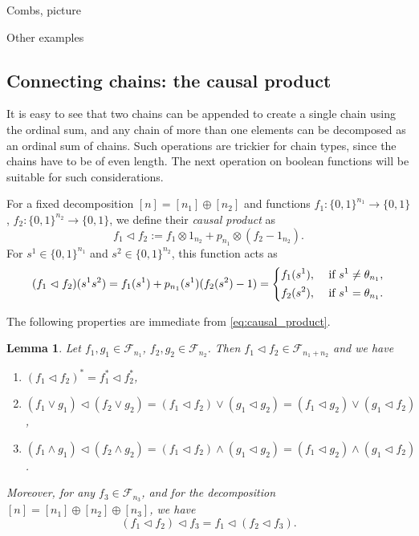 \documentclass[12pt]{article}
\newtheorem{lemma}{Lemma}
\theoremstyle{definition}
\theoremstyle{remark}
\newtheorem{remark}{Remark}
\def\Fe{\mathcal F}
\def\vtl{\vartriangleleft}
\begin{document}
Combs, picture

Other examples



\subsection{Connecting chains: the causal product}



It is easy to see that two chains can be appended to create a single chain using the
ordinal sum, and any chain
of more than one elements can be decomposed as an ordinal sum of  chains. Such operations are trickier for
chain types, since the chains have to be of even length. The next operation on boolean
functions will be suitable for such considerations. 
 
For a fixed decomposition $[n]=[n_1]\oplus[n_2]$ and functions
$f_1:\{0,1\}^{n_1}\to \{0,1\}$, $f_2:\{0,1\}^{n_2}\to \{0,1\}$, we define their {\em
causal product} as 
\[
f_1\vartriangleleft f_2:=f_1\otimes 1_{n_2}+p_{n_1}\otimes (f_2-1_{n_2}).
\]
For  $s^1\in \{0,1\}^{n_1}$ and $s^2\in \{0,1\}^{n_2}$, this function acts as
\begin{equation}\label{eq:causal_product}
(f_1\vtl f_2)(s^1s^2)= f_1(s^1)+p_{n_1}(s^1)(f_2(s^2)-1)=\begin{dcases} f_1(s^1), &
\text{ if } s^1\ne \theta_{n_1},\\
   f_2(s^2), & \text{ if } s^1=\theta_{n_1}.
   \end{dcases}
\end{equation}

%
%
%
The following properties are immediate from \eqref{eq:causal_product}. 

\begin{lemma}\label{lemma:causal_product}
Let $f_1,g_1\in \Fe_{n_1}$, $f_2,g_2\in \Fe_{n_2}$. Then $f_1\vartriangleleft f_2\in \Fe_{n_1+n_2}$ and we
have 
\begin{enumerate}
\item[(i)] $(f_1\vtl f_2)^*=f_1^*\vtl f_2^*$,
\item[(ii)]$(f_1\vee g_1)\vtl (f_2\vee g_2)=(f_1\vtl f_2)\vee ( g_1\vtl g_2)=(f_1\vtl
g_2)\vee (g_1\vtl f_2)$,
\item[(iii)] $(f_1\wedge g_1)\vtl (f_2\wedge g_2)=(f_1\vtl f_2)\wedge ( g_1\vtl g_2)=(f_1\vtl
g_2)\wedge (g_1\vtl f_2)$.
\end{enumerate}
Moreover, for any $f_3\in \Fe_{n_3}$, and for the decomposition $[n]=[n_1]\oplus
[n_2]\oplus [n_3]$, we have 
\[
(f_1\vtl f_2)\vtl f_3=f_1\vtl (f_2\vtl f_3).
\]
\end{lemma}
\end{document}
